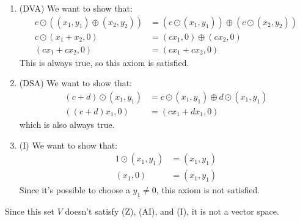 \begin{sol}
\begin{enumerate}
    \item (DVA) We want to show that:
    \begin{align}
        c \odot \left((x_1,y_1) \oplus (x_2,y_2) \right) &= \left(c \odot (x_1,y_1)\right) \oplus \left(c \odot (x_2,y_2)\right) \\
        c \odot \left(x_1+x_2, 0\right) &= (cx_1,0) \oplus (cx_2,0) \\ 
        (cx_1+cx_2,0) &= (cx_1+cx_2,0)
    \end{align}
    This is always true, so this axiom is satisfied.
    \item (DSA) We want to show that:
    \begin{align}
        (c+d) \odot (x_1,y_1) &= c \odot (x_1,y_1) \oplus d \odot (x_1,y_1) \\ 
        ((c+d)x_1,0) &= (cx_1+dx_1,0) 
    \end{align}
    which is also always true.
    \item (I) We want to show that:
    \begin{align}
        1 \odot (x_1,y_1) &= (x_1,y_1) \\ 
        (x_1,0) &= (x_1,y_1) 
    \end{align}
    Since it's possible to choose a $y_1 \neq 0$, this axiom is not satisfied.
\end{enumerate}
Since this set $V$ doesn't satisfy (Z), (AI), and (I), it is not a vector space.
\end{sol}